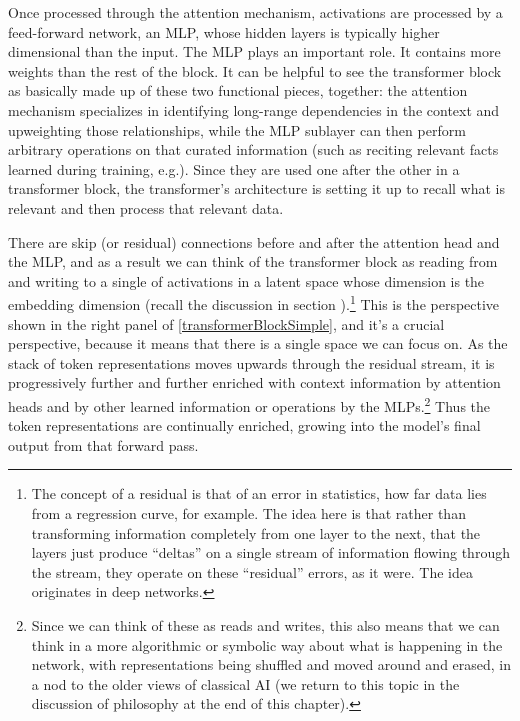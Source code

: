 
Once processed through the attention mechanism, activations are processed by a
feed-forward network, an MLP, whose hidden layers is typically higher
dimensional than the input.	The MLP plays an important role. It contains more
weights than the rest of the block. It can be helpful to see the transformer
block as basically made up of these two functional pieces, together: the
attention mechanism specializes in identifying long-range dependencies in the
context and upweighting those relationships, while the MLP sublayer can then
perform arbitrary operations on that curated information (such as reciting
relevant facts learned during training, e.g.). Since they are used one after
the other in a transformer block, the transformer's architecture is setting it
up to recall what is relevant and then process that relevant data.

There are skip (or residual) connections before and after the attention head
and the MLP, and as a result we can think of the transformer block as reading
from and writing to a single  of activations in a
latent space \cite{elhage2021mathematical, milliere2024philosophical2} whose
dimension is the embedding dimension (recall the discussion in section
).\footnote{The concept of a residual is that of an error
in statistics, how far data lies from a regression curve, for example. The idea
here is that rather than transforming information completely from one layer to
the next, that the layers just produce ``deltas'' on a single stream of
information flowing through the stream, they operate on these ``residual''
errors, as it were. The idea originates in deep networks.} This is the
perspective shown in the right panel of \ref{transformerBlockSimple}, and it's
a crucial perspective, because it means that there is a single space we can
focus on. As the stack of token representations moves upwards through the
residual stream, it is progressively further and further enriched with context
information by attention heads and by other learned information or operations
by the MLPs.\footnote{Since we can think of these as reads and writes, this
also means that we can think in a more algorithmic or symbolic way about what
is happening in the network, with representations being shuffled and moved
around and erased, in a nod to the older views of classical AI (we return to
this topic in the discussion of philosophy at the end of this chapter).} Thus
the token representations are continually enriched, growing into the model's
final output from that forward pass. 

